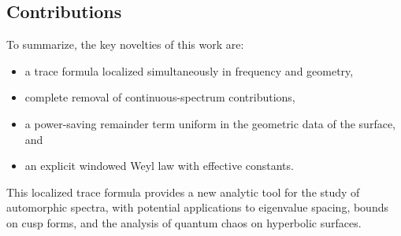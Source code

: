\subsection*{Contributions}
To summarize, the key novelties of this work are:
\begin{itemize}
  \item a trace formula localized simultaneously in frequency and geometry, 
  \item complete removal of continuous-spectrum contributions,
  \item a power-saving remainder term uniform in the geometric data of the surface, and
  \item an explicit windowed Weyl law with effective constants. 
\end{itemize}

This localized trace formula provides a new analytic tool for the study of automorphic spectra, 
with potential applications to eigenvalue spacing, bounds on cusp forms, 
and the analysis of quantum chaos on hyperbolic surfaces.

